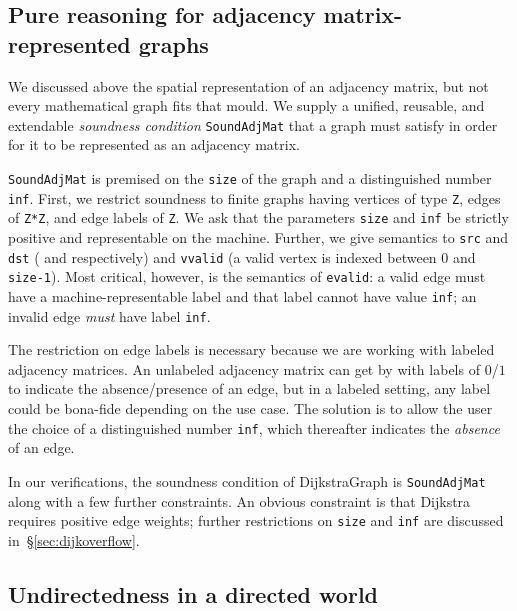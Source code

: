

\subsection{Pure reasoning for adjacency matrix-represented graphs}

We discussed above the spatial representation of an adjacency 
matrix, but not every mathematical graph fits that mould.
We supply a unified, reusable, and extendable \emph{soundness condition} 
\texttt{SoundAdjMat} that a graph must satisfy in order for it 
to be represented as an adjacency matrix.

\texttt{SoundAdjMat} is premised on the \texttt{size} of the graph
and a distinguished number \texttt{inf}.
First, we restrict soundness to finite graphs having 
vertices of type \texttt{Z}, edges of \texttt{Z*Z}, and 
edge labels of \texttt{Z}. 
We ask that the parameters \texttt{size} and \texttt{inf} be
strictly positive and representable on the machine. 
Further, we give semantics to \texttt{src} and \texttt{dst} 
( and  respectively)
and \texttt{vvalid} (a valid vertex is indexed between $0$ and \texttt{size-1}).
Most critical, however, is the semantics of \texttt{evalid}:
a valid edge must have a machine-representable label and that label
cannot have value \texttt{inf}; an invalid edge \emph{must} have label \texttt{inf}.

The restriction on edge labels is necessary because we are working 
with labeled adjacency matrices. An unlabeled 
adjacency matrix can get by with labels of $0$/$1$ to 
indicate the absence/presence of an edge, but in a labeled 
setting, any label could be bona-fide depending on the use case. 
The solution is to 
allow the user the choice of a distinguished number \texttt{inf},
which thereafter indicates the \emph{absence} of an edge.

In our verifications, 
the soundness condition of DijkstraGraph is \texttt{SoundAdjMat}
along with a few further constraints. An obvious constraint is that Dijkstra 
requires positive edge weights; further restrictions on 
\texttt{size} and \texttt{inf} are discussed in~\S\ref{sec:dijkoverflow}.




\subsection{Undirectedness in a directed world}

